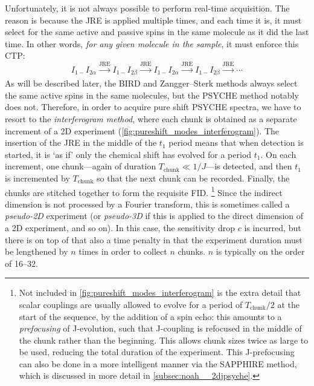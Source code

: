 Unfortunately, it is not always possible to perform real-time acquisition.
The reason is because the JRE is applied multiple times, and each time it is, it must select for the same active and passive spins in the same molecule as it did the last time.
In other words, \textit{for any given molecule in the sample}, it must enforce this CTP:
\begin{equation}
    \label{eq:real_time_pureshift}
    I_{1-}I_{2\alpha} \xrightarrow[]{\text{JRE}} I_{1-}I_{2\beta} \xrightarrow[]{\text{JRE}} I_{1-}I_{2\alpha} \xrightarrow[]{\text{JRE}} I_{1-}I_{2\beta} \xrightarrow[]{\text{JRE}} \cdots
\end{equation}
As will be described later, the BIRD and Zangger--Sterk methods always select the same active spins in the same molecules, but the PSYCHE method notably does not.
Therefore, in order to acquire pure shift PSYCHE spectra, we have to resort to the \textit{interferogram method}, where each chunk is obtained as a separate increment of a 2D experiment (\cref{fig:pureshift_modes_interferogram}).
The insertion of the JRE in the middle of the $t_1$ period means that when detection is started, it is `as if' only the chemical shift has evolved for a period $t_1$.
On each increment, one chunk---again of duration $T_\text{chunk} \ll 1/J$---is detected, and then $t_1$ is incremented by $T_\text{chunk}$ so that the next chunk can be recorded.
Finally, the chunks are stitched together to form the requisite FID.%
\footnote{Not included in \cref{fig:pureshift_modes_interferogram} is the extra detail that scalar couplings are usually allowed to evolve for a period of $T_\text{chunk}/2$ at the start of the sequence, by the addition of a spin echo: this amounts to a \textit{prefocusing} of J-evolution, such that J-coupling is refocused in the middle of the chunk rather than the beginning\autocite{Aguilar2010ACIE}.
This allows chunk sizes twice as large to be used, reducing the total duration of the experiment.
This J-prefocusing can also be done in a more intelligent manner via the SAPPHIRE method\autocite{Moutzouri2017CC}, which is discussed in more detail in \cref{subsec:noah__2djpsyche}.}
Since the indirect dimension is not processed by a Fourier transform, this is sometimes called a \textit{pseudo-2D} experiment (or \textit{pseudo-3D} if this is applied to the direct dimension of a 2D experiment, and so on).
In this case, the sensitivity drop $c$ is incurred, but there is on top of that also a time penalty in that the experiment duration must be lengthened by $n$ times in order to collect $n$ chunks.
$n$ is typically on the order of 16--32.

